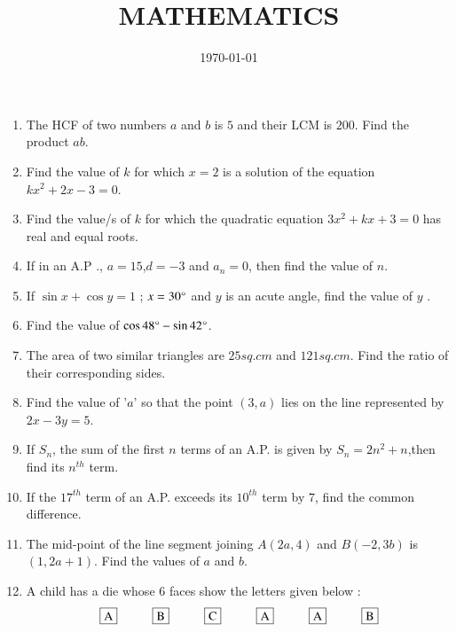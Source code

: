 \documentclass[2pt,-letter paper]{article}
\title{MATHEMATICS}
\date{\today}
\providecommand{\brak}[1]{\ensuremath{\left(#1\right)}}
\begin{document}
\maketitle
\begin{enumerate}
\item The HCF of two numbers $a$ and $b$ is $5$ and their LCM is $200 $. Find the product $ab$.

\item Find the value of $k$ for which $x = 2$ is a solution of the equation
  $kx^2 + 2x - 3 = 0$.
  
\item Find the value/s of $k$ for which the quadratic equation $3x^{2} + kx + 3 = 0$
has real and equal roots.

\item If in an A.P ., $a=15$,$d=-3$ and $a_n=0$, then find the value of $n$.

\item If $\sin{x} + \cos{y}= 1$ ; $x=30\degree$  and  $y$ is an acute angle, find the value of $y$ .

\item Find the value of $\cos {48\degree} - \sin {42\degree}$.

\item The area of two similar triangles are $25 sq. cm$ and $121 sq. cm$. Find the
ratio of their corresponding sides. 

\item Find the value of '$a$' so that the point $\brak{3, a}$ lies on the line represented
by $2 x - 3 y = 5$.

\item If ${S_n}$, the sum of the first ${n}$ terms of an A.P. is given by ${S_n = 2n^2 + n}$,then find its $n^{th}$ term. 

\item If the $17^{th}$ term of an A.P. exceeds its $10^{th}$ term by $7$, find the common difference.

\item The mid-point of the line segment joining $A\brak{2a, 4}$ and $B\brak{-2, 3b}$ is $\brak{1, 2a + 1}$. Find the values of $a$ and $b$.

\item A child has a die whose $6$ faces show the letters given below :
\begin{align*}
    { \framebox {A} \hspace{1cm}} {\framebox {B} \hspace{1cm}} {\framebox {C}\hspace{1cm}} {\framebox {A}\hspace{1cm}} {\framebox {A}\hspace{1cm}} {\framebox {B}}
\end{align*}


\end{enumerate}
\end{document}
